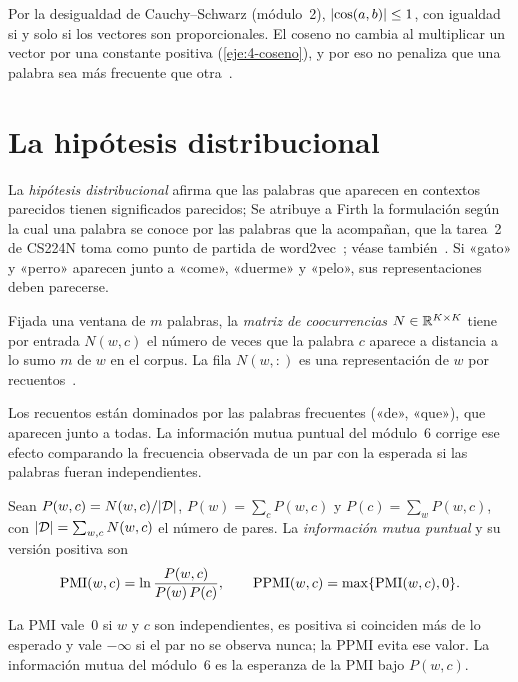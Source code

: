 Por la desigualdad de Cauchy--Schwarz (módulo~2), $\lvert\cos(a,b)\rvert\le 1$, con igualdad si y solo si los vectores son proporcionales. El coseno no cambia al multiplicar un vector por una constante positiva (\cref{eje:4-coseno}), y por eso no penaliza que una palabra sea más frecuente que otra~\cite[§5.4]{jm3}.

\section{La hipótesis distribucional}

La \emph{hipótesis distribucional} afirma que las palabras que aparecen en contextos parecidos tienen significados parecidos; Se atribuye a Firth la formulación según la cual una palabra se conoce por las palabras que la acompañan, que la tarea~2 de CS224N toma como punto de partida de word2vec~\cite{cs224n}; véase también~\cite[§5.2]{jm3}. Si «gato» y «perro» aparecen junto a «come», «duerme» y «pelo», sus representaciones deben parecerse.

\begin{definicion}
Fijada una ventana de $m$ palabras, la \emph{matriz de coocurrencias} $N\in\mathbb{R}^{K\times K}$ tiene por entrada $N(w,c)$ el número de veces que la palabra $c$ aparece a distancia a lo sumo $m$ de $w$ en el corpus. La fila $N(w,:)$ es una representación de $w$ por recuentos~\cite[§5.3]{jm3}.
\end{definicion}

Los recuentos están dominados por las palabras frecuentes («de», «que»), que aparecen junto a todas. La información mutua puntual del módulo~6 corrige ese efecto comparando la frecuencia observada de un par con la esperada si las palabras fueran independientes.

\begin{definicion}\label{def:pmi}
Sean $P(w,c)=N(w,c)/\lvert\mathcal{D}\rvert$, $P(w)=\sum_c P(w,c)$ y $P(c)=\sum_w P(w,c)$, con $\lvert\mathcal{D}\rvert=\sum_{w,c}N(w,c)$ el número de pares. La \emph{información mutua puntual} y su versión positiva son
\[
\operatorname{PMI}(w,c)=\ln\frac{P(w,c)}{P(w)\,P(c)},\qquad \operatorname{PPMI}(w,c)=\max\{\operatorname{PMI}(w,c),0\}.
\]
\end{definicion}

La PMI vale~0 si $w$ y $c$ son independientes, es positiva si coinciden más de lo esperado y vale $-\infty$ si el par no se observa nunca; la PPMI evita ese valor. La información mutua del módulo~6 es la esperanza de la PMI bajo $P(w,c)$.


